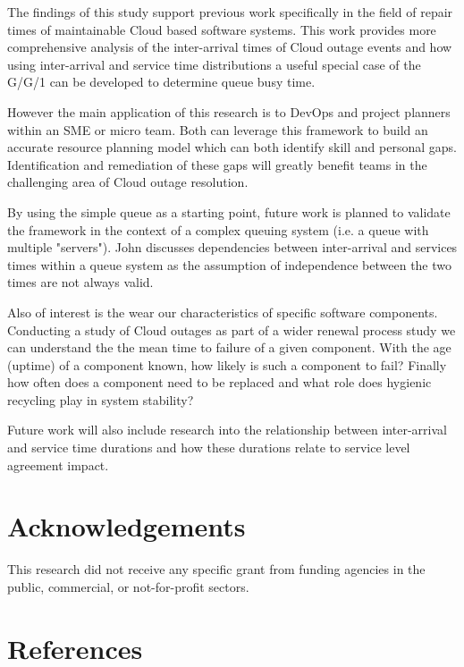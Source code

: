\documentclass[5p]{elsarticle}
\begin{document}
The findings of this study support previous work specifically in the field of repair times of maintainable Cloud based software systems. This work provides  more comprehensive analysis of the inter-arrival times of Cloud outage events and how using inter-arrival and service time distributions a useful special case of the G/G/1 can be developed to determine queue busy time. 

However the main application of this research is to DevOps and project planners within an SME or micro team. Both can leverage this framework to build an accurate resource planning model which can both identify skill and personal gaps. Identification and remediation of these gaps will greatly benefit teams in the challenging area of Cloud outage resolution.

By using the simple queue as a starting point, future work is planned to validate the framework in the context of a complex queuing system (i.e. a queue with multiple "servers"). John \cite{john1963single} discusses dependencies between inter-arrival and services times within a queue system as the assumption of independence between the two times are not always valid.

Also of interest is the wear our characteristics of specific software components. Conducting a study of Cloud outages as part of a wider renewal process study we can understand the the mean time to failure of a given component.  With the age (uptime) of a component known, how likely is such a component to fail? Finally how often does a component need to be replaced and what role does hygienic recycling play in system stability?

Future work will also include research into the relationship between inter-arrival and service time durations and how these durations relate to service level agreement impact.

\section{Acknowledgements}

This research did not receive any specific grant from funding agencies in the public, commercial, or not-for-profit sectors.

\section*{References}


\end{document}
